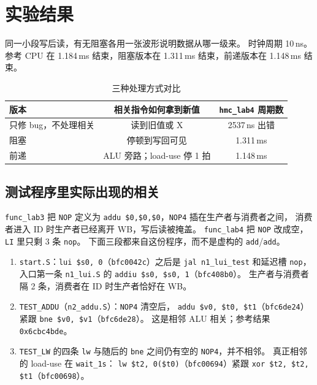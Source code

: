 \documentclass{article}
\begin{document}
\section{实验结果}
同一小段写后读，有无阻塞各用一张波形说明数据从哪一级来。
时钟周期 10\,ns。参考 CPU 在 1.184\,ms 结束，阻塞版本在 1.311\,ms 结束，前递版本在 1.148\,ms 结束。

\begin{table}[H]
  \centering
  \caption{三种处理方式对比}
  \begin{tabular}{lcc}
    \toprule
    版本 & 相关指令如何拿到新值 & \texttt{hmc\_lab4} 周期数 \\
    \midrule
    只修 bug，不处理相关 & 读到旧值或 X & 2537\,ns 出错 \\
    阻塞 & 停顿到写回可见 & 1.311\,ms \\
    前递 & ALU 旁路；load-use 停 1 拍 & 1.148\,ms \\
    \bottomrule
  \end{tabular}
\end{table}

\subsection{测试程序里实际出现的相关}
\texttt{func\_lab3} 把 \texttt{NOP} 定义为 \texttt{addu \$0,\$0,\$0}，\texttt{NOP4} 插在生产者与消费者之间，
消费者进入 ID 时生产者已经离开 WB，写后读被掩盖。
\texttt{func\_lab4} 把 \texttt{NOP} 改成空，\texttt{LI} 里只剩 3 条 \texttt{nop}。
下面三段都来自这份程序，而不是虚构的 \texttt{add}/\texttt{add}。

\begin{enumerate}
  \item \texttt{start.S}：\texttt{lui \$s0, 0}（\texttt{bfc0042c}）之后是
        \texttt{jal n1\_lui\_test} 和延迟槽 \texttt{nop}，
        入口第一条 \texttt{n1\_lui.S} 的 \texttt{addiu \$s0, \$s0, 1}（\texttt{bfc408b0}）。
        生产者与消费者隔 2 条，消费者在 ID 时生产者恰好在 WB。
  \item \texttt{TEST\_ADDU}（\texttt{n2\_addu.S}）：\texttt{NOP4} 清空后，
        \texttt{addu \$v0, \$t0, \$t1}（\texttt{bfc6de24}）紧跟
        \texttt{bne \$v0, \$v1}（\texttt{bfc6de28}）。
        这是相邻 ALU 相关；参考结果 \texttt{0x6cbc4bde}。
  \item \texttt{TEST\_LW} 的四条 \texttt{lw} 与随后的 \texttt{bne} 之间仍有空的 \texttt{NOP4}，并不相邻。
        真正相邻的 load-use 在 \texttt{wait\_1s}：
        \texttt{lw \$t2, 0(\$t0)}（\texttt{bfc00694}）紧跟
        \texttt{xor \$t2, \$t2, \$t1}（\texttt{bfc00698}）。
\end{enumerate}
\end{document}

